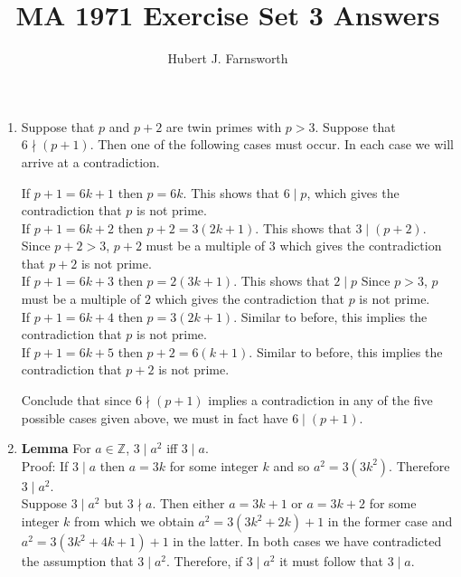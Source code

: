 \documentclass[a4paper]{article}
\title{MA 1971 Exercise Set 3 Answers}
\author{Hubert J. Farnsworth}
\begin{document}
\maketitle

\begin{enumerate}

\item

Suppose that $p$ and $p+2$ are twin primes with $p > 3$. Suppose that $6 \nmid (p+1)$. Then one of the following cases must occur. In each case we will arrive at a contradiction.

If $p+1 = 6k+1$ then $p = 6k$. This shows that $6 \mid p$, which gives the contradiction that $p$ is not prime.\\

If $p+1 = 6k+2$ then $p+2 = 3(2k + 1)$. This shows that $3 \mid (p+2)$. Since $p+2 > 3$, $p+2$ must be a multiple of $3$ which gives the contradiction that $p+2$ is not prime.\\

If $p+1 = 6k+3$ then $p = 2(3k + 1)$. This shows that $2 \mid p$ Since $p > 3$, $p$ must be a multiple of $2$ which gives the contradiction that $p$ is not prime. \\

If $p+1 = 6k + 4$ then $p = 3(2k + 1)$. Similar to before, this implies the contradiction that $p$ is not prime. \\

If $p+1 = 6k + 5$ then $p+2 = 6(k+1)$. Similar to before, this implies the contradiction that $p+2$ is not prime.

Conclude that since $6 \nmid (p+1)$ implies a contradiction in any of the five possible cases given above, we must in fact have $6 \mid (p+1)$.

\item

\textbf{Lemma} For $a \in \mathbb{Z}$, $3 \mid a^2$ iff $3 \mid a$. \\

Proof: If $3 \mid a$ then $a = 3k$ for some integer $k$ and so $a^2 = 3(3k^2)$. Therefore $3 \mid a^2$. \\

Suppose $3 \mid a^2$ but $3 \nmid a$. Then either $a = 3k+1$ or $a = 3k+2$ for some integer $k$ from which we obtain $a^2 = 3(3k^2+2k)+1$ in the former case and $a^2 = 3(3k^2 + 4k + 1) + 1$ in the latter. In both cases we have contradicted the assumption that $3 \mid a^2$. Therefore, if $3 \mid a^2$ it must follow that $3 \mid a$.\\


\end{enumerate}
\end{document}
